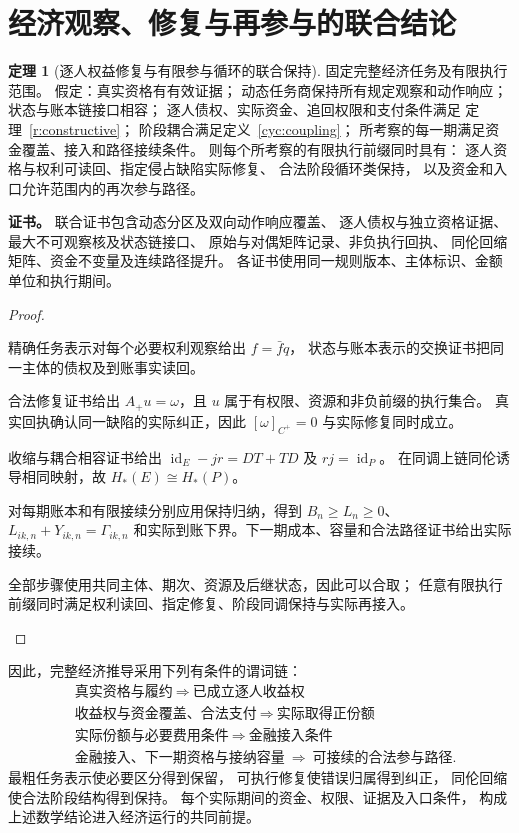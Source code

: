 \documentclass[UTF8,12pt,a4paper,openany,fontset=none,zihao=false]{ctexrep}
\theoremstyle{definition}
\newtheorem{theorem}{定理}[chapter]
\newenvironment{certificate}{\par\noindent\textbf{证书。}\ignorespaces}{\par}
\newcommand{\1}{\mathbf 1}
\begin{document}
\section{经济观察、修复与再参与的联合结论}
\begin{theorem}[逐人权益修复与有限参与循环的联合保持]
\label{cyc:joint}
固定完整经济任务及有限执行范围。
假定：真实资格有有效证据；
动态任务商保持所有规定观察和动作响应；
状态与账本链接口相容；
逐人债权、实际资金、追回权限和支付条件满足
定理~\ref{r:constructive}；
阶段耦合满足定义~\ref{cyc:coupling}；
所考察的每一期满足资金覆盖、接入和路径接续条件。
则每个所考察的有限执行前缀同时具有：
逐人资格与权利可读回、指定侵占缺陷实际修复、
合法阶段循环类保持，
以及资金和入口允许范围内的再次参与路径。
\end{theorem}
\begin{certificate}
联合证书包含动态分区及双向动作响应覆盖、
逐人债权与独立资格证据、
最大不可观察核及状态链接口、
原始与对偶矩阵记录、非负执行回执、
同伦回缩矩阵、资金不变量及连续路径提升。
各证书使用同一规则版本、主体标识、金额单位和执行期间。
\end{certificate}
\begin{proof}
\begin{semanticsteps}
\item 精确任务表示对每个必要权利观察给出 \(f=\bar f q\)，
状态与账本表示的交换证书把同一主体的债权及到账事实读回。
\item 合法修复证书给出 \(A_+u=\omega\)，且 \(u\) 属于有权限、资源和非负前缀的执行集合。
真实回执确认同一缺陷的实际纠正，因此 \([\omega]_{C^+}=0\) 与实际修复同时成立。
\item 收缩与耦合相容证书给出
\(\operatorname{id}_E-jr=DT+TD\) 及 \(rj=\operatorname{id}_P\)。
在同调上链同伦诱导相同映射，故 \(H_*(E)\cong H_*(P)\)。
\item 对每期账本和有限接续分别应用保持归纳，得到
\(B_n\ge L_n\ge0\)、\(L_{ik,n}+Y_{ik,n}=\Gamma_{ik,n}\)
和实际到账下界。下一期成本、容量和合法路径证书给出实际接续。
\item 全部步骤使用共同主体、期次、资源及后继状态，因此可以合取；
任意有限执行前缀同时满足权利读回、指定修复、阶段同调保持与实际再接入。
\end{semanticsteps}
\end{proof}
因此，完整经济推导采用下列有条件的谓词链：
\[
\begin{aligned}
&\text{真实资格与履约}
\ \Longrightarrow\ \text{已成立逐人收益权}\\
&\text{收益权与资金覆盖、合法支付}
\ \Longrightarrow\ \text{实际取得正份额}\\
&\text{实际份额与必要费用条件}
\ \Longrightarrow\ \text{金融接入条件}\\
&\text{金融接入、下一期资格与接纳容量}
\ \Longrightarrow\ \text{可接续的合法参与路径}.
\end{aligned}
\]
最粗任务表示使必要区分得到保留，
可执行修复使错误归属得到纠正，
同伦回缩使合法阶段结构得到保持。
每个实际期间的资金、权限、证据及入口条件，
构成上述数学结论进入经济运行的共同前提。
\end{document}
